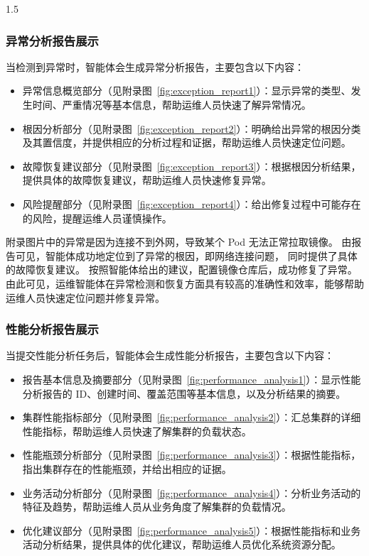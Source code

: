\documentclass[a4paper,12pt]{report}
\begin{document}
\begin{spacing}{1.5}
\subsubsection{异常分析报告展示}
当检测到异常时，智能体会生成异常分析报告，主要包含以下内容：
\begin{itemize}
	\item 异常信息概览部分（见附录图~\ref{fig:exception_report1}）：显示异常的类型、发生时间、严重情况等基本信息，帮助运维人员快速了解异常情况。
	\item 根因分析部分（见附录图~\ref{fig:exception_report2}）：明确给出异常的根因分类及其置信度，并提供相应的分析过程和证据，帮助运维人员快速定位问题。
	\item 故障恢复建议部分（见附录图~\ref{fig:exception_report3}）：根据根因分析结果，提供具体的故障恢复建议，帮助运维人员快速修复异常。
	\item 风险提醒部分（见附录图~\ref{fig:exception_report4}）：给出修复过程中可能存在的风险，提醒运维人员谨慎操作。
\end{itemize}
附录图片中的异常是因为连接不到外网，导致某个 Pod 无法正常拉取镜像。
由报告可见，智能体成功地定位到了异常的根因，即网络连接问题，
同时提供了具体的故障恢复建议。
按照智能体给出的建议，配置镜像仓库后，成功修复了异常。
由此可见，运维智能体在异常检测和恢复方面具有较高的准确性和效率，能够帮助运维人员快速定位问题并修复异常。

\subsubsection{性能分析报告展示}
当提交性能分析任务后，智能体会生成性能分析报告，主要包含以下内容：
\begin{itemize}
	\item 报告基本信息及摘要部分（见附录图~\ref{fig:performance_analysis1}）：显示性能分析报告的 ID、创建时间、覆盖范围等基本信息，以及分析结果的摘要。
	\item 集群性能指标部分（见附录图~\ref{fig:performance_analysis2}）：汇总集群的详细性能指标，帮助运维人员快速了解集群的负载状态。
	\item 性能瓶颈分析部分（见附录图~\ref{fig:performance_analysis3}）：根据性能指标，指出集群存在的性能瓶颈，并给出相应的证据。
	\item 业务活动分析部分（见附录图~\ref{fig:performance_analysis4}）：分析业务活动的特征及趋势，帮助运维人员从业务角度了解集群的负载情况。
	\item 优化建议部分（见附录图~\ref{fig:performance_analysis5}）：根据性能指标和业务活动分析结果，提供具体的优化建议，帮助运维人员优化系统资源分配。
\end{itemize}


\end{spacing}
\end{document}
